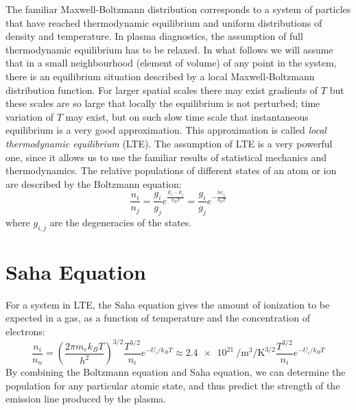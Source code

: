 \documentclass[justified,nofonts,nobib,openany]{tufte-book}
\begin{document}
The familiar Maxwell-Boltzmann distribution corresponds to a system of particles that have reached thermodynamic equilibrium and uniform distributions of density and temperature. In plasma diagnostics, the assumption of full thermodynamic equilibrium has to be relaxed. In what follows we will assume that in a small neighbourhood (element of volume) of any point in the system, there is an equilibrium situation described by a local Maxwell-Boltzmann distribution function. For larger spatial scales there may exist gradients of $T$ but these scales are so large that locally the equilibrium is not perturbed; time variation of $T$ may exist, but on such slow time scale that instantaneous equilibrium is a very good approximation. This approximation is  called \emph{local thermodynamic equilibrium} (LTE). The assumption of LTE is a very powerful one, since it allows us to use the familiar results of statistical mechanics and thermodynamics. The relative populations of different states of an atom or ion are described by the Boltzmann equation:
\begin{equation}
		\frac{n_i}{n_j}=\frac{g_i}{g_j}e^{\frac{E_i-E_j}{k_B T}}=\frac{g_i}{g_j}e^{-\frac{h\nu_{ij}}{k_B T}}
\end{equation}
where $g_{i,j}$ are the degeneracies of the states. 

\section{Saha Equation}\label{sec:saha}
For a system in LTE, the Saha equation gives the amount of ionization to be expected in a gas, as a function of temperature and the concentration of electrons:
\begin{equation}
		\frac{n_i}{n_n}= \left(\frac{2 \pi m_e k_B T}{h^2}\right)^{3/2}\frac{T^{3/2}}{n_i}e^{-U_i/k_B T} \approx \SI{2.4e21}{\per \metre\cubed \per\kelvin\tothe{3/2}} \frac{T^{3/2}}{n_i}e^{-U_i/k_B T}
\end{equation}
By combining the Boltzmann equation and Saha equation, we can determine the population for any particular atomic state, and thus predict the strength of the emission line produced by the plasma.
\end{document}
